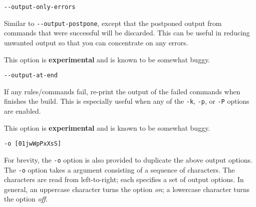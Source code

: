  \verb+--output-only-errors+ 

Similar to \verb+--output-postpone+, except that the postponed output from commands that were
successful will be discarded. This can be useful in reducing unwanted output so that you can
concentrate on any errors.

This option is \textbf{experimental} and is known to be somewhat buggy.

 \verb+--output-at-end+

If any rules/commands fail, re-print the output of the failed commands when \OMake{} finishes the
build. This is especially useful when any of the \verb+-k+, \verb+-p+, or \verb+-P+ options are
enabled.

This option is \textbf{experimental} and is known to be somewhat buggy.

 \verb+-o [01jwWpPxXsS]+

For brevity, the \verb+-o+ option is also provided to duplicate the above output options.  The
\verb+-o+ option takes a argument consisting of a sequence of characters.  The characters are read
from left-to-right; each specifies a set of output options.  In general, an uppercase character turns
the option \emph{on}; a lowercase character turns the option \emph{off}.

